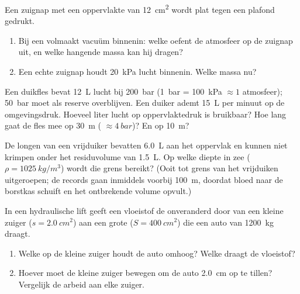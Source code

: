 \begin{exercise}[$\star\star\star$]\label{exo:g10:pressure:12}
Een zuignap met een oppervlakte van \qty{12}{cm^2} wordt plat tegen een
plafond gedrukt.
\begin{enumerate}
  \item Bij een volmaakt vacuüm binnenin: welke  oefent de
        atmosfeer op de zuignap uit, en welke hangende massa kan hij
        dragen?
  \item Een echte zuignap houdt \qty{20}{kPa} lucht binnenin. Welke
        massa nu?
\end{enumerate}
\end{exercise}

\begin{exercise}[$\star\star\star$]\label{exo:g10:pressure:13}
Een duikfles bevat \qty{12}{L} lucht bij \qty{200}{bar}
(\qty{1}{bar} = \qty{100}{kPa} $\approx 1$ atmosfeer); \qty{50}{bar}
moet als reserve overblijven. Een duiker ademt \qty{15}{L} per minuut op
de omgevingsdruk. Hoeveel liter lucht op oppervlaktedruk is bruikbaar?
Hoe lang gaat de fles mee op \qty{30}{m} (
$\approx \qty{4}{bar}$)? En op \qty{10}{m}?
\end{exercise}

\begin{exercise}[$\star\star\star$]\label{exo:g10:pressure:14}
De longen van een vrijduiker bevatten \qty{6.0}{L} aan het oppervlak en
kunnen niet krimpen onder het residuvolume van \qty{1.5}{L}. Op welke
diepte in zee ($\rho = \qty{1025}{kg/m^3}$) wordt die grens bereikt?
(Ooit tot grens van het vrijduiken uitgeroepen; de records gaan
inmiddels voorbij \qty{100}{m}, doordat bloed naar de borstkas schuift
en het ontbrekende volume opvult.)
\end{exercise}

\begin{exercise}[$\star\star\star$]\label{exo:g10:pressure:15}
In een hydraulische lift geeft een vloeistof de  onveranderd door
van een kleine zuiger ($s = \qty{2.0}{cm^2}$) aan een grote
($S = \qty{400}{cm^2}$) die een auto van \qty{1200}{kg} draagt.
\begin{enumerate}
  \item Welke  op de kleine zuiger houdt de auto omhoog? Welke 
        draagt de vloeistof?
  \item Hoever moet de kleine zuiger bewegen om de auto \qty{2.0}{cm} op
        te tillen? Vergelijk de arbeid aan elke zuiger.
\end{enumerate}
\end{exercise}

